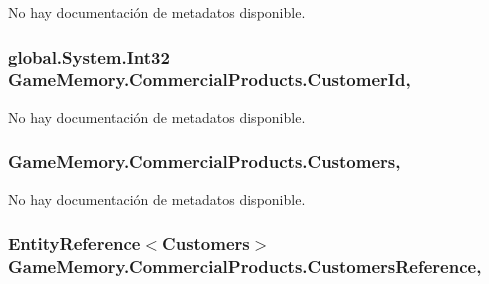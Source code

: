 No hay documentación de metadatos disponible. 

\hypertarget{class_game_memory_1_1_commercial_products_a25aeb7ff0bac027b1bb5a3a20e359468}{
\subsubsection[{Customer\-Id}]{\setlength{\rightskip}{0pt plus 5cm}global.\-System.\-Int32 Game\-Memory.\-Commercial\-Products.\-Customer\-Id\hspace{0.3cm}{\ttfamily [get]}, {\ttfamily [set]}}}\label{class_game_memory_1_1_commercial_products_a25aeb7ff0bac027b1bb5a3a20e359468}


No hay documentación de metadatos disponible. 

\hypertarget{class_game_memory_1_1_commercial_products_ad685be3364d165d72cc7312b662c9ce7}{
\subsubsection[{Customers}]{ Game\-Memory.\-Commercial\-Products.\-Customers\hspace{0.3cm}{\ttfamily [get]}, {\ttfamily [set]}}}\label{class_game_memory_1_1_commercial_products_ad685be3364d165d72cc7312b662c9ce7}


No hay documentación de metadatos disponible. 

\hypertarget{class_game_memory_1_1_commercial_products_ae025504cc119bffe39d2430da20d9ba1}{
\subsubsection[{Customers\-Reference}]{\setlength{\rightskip}{0pt plus 5cm}Entity\-Reference$<${\bf Customers}$>$ Game\-Memory.\-Commercial\-Products.\-Customers\-Reference\hspace{0.3cm}{\ttfamily [get]}, {\ttfamily [set]}}}\label{class_game_memory_1_1_commercial_products_ae025504cc119bffe39d2430da20d9ba1}



